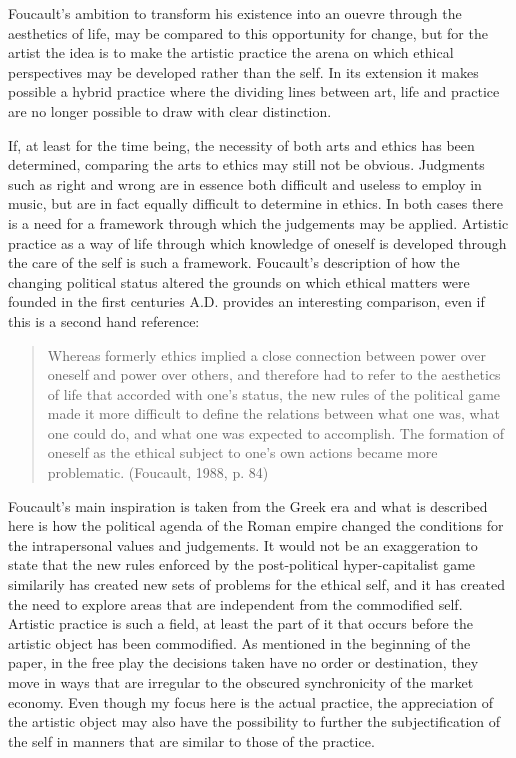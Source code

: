 \documentclass[11pt]{article}
\makeatletter
\newcommand{\cslcitation}[2]
 {\protect\hyper@linkstart{cite}{citeproc_bib_item_#1}#2\hyper@linkend}
\makeatother
\begin{document}
Foucault's ambition to transform his existence into an ouevre through the aesthetics of life, may be compared to this opportunity for change, but for the artist the idea is to make the artistic practice the arena on which ethical perspectives may be developed rather than the self. In its extension it makes possible a hybrid practice where the dividing lines between art, life and practice are no longer possible to draw with clear distinction.

If, at least for the time being, the necessity of both arts and ethics has been determined, comparing the arts to ethics may still not be obvious.
Judgments such as right and wrong are in essence both difficult and useless to employ in music, but are in fact equally difficult to determine in ethics. In both cases there is a need for a framework through which the judgements may be applied.  Artistic practice as a way of life through which knowledge of oneself is developed through the care of the self is such a framework. Foucault's description of how the changing political status altered the grounds on which ethical matters were founded in the first centuries A.D. provides an interesting comparison, even if this is a second hand reference:
\begin{quote}
Whereas formerly ethics implied a close connection between power over oneself and power over others, and therefore had to refer to the aesthetics of life that accorded with one's status, the new rules of the political game made it more difficult to define the relations between what one was, what one could do, and what one was expected to accomplish. The formation of oneself as the ethical subject to one's own actions became more problematic. (\cslcitation{7}{Foucault, 1988, p. 84})
\end{quote}
Foucault's main inspiration is taken from the Greek era and what is described here is how the political agenda of the Roman empire changed the conditions for the intrapersonal values and judgements.
It would not be an exaggeration to state that the new rules enforced by the post-political hyper-capitalist game similarily has created new sets of problems for the ethical self, and it has created the need to explore areas that are independent from the commodified self. Artistic practice is such a field, at least the part of it that occurs before the artistic object has been commodified. As mentioned in the beginning of the paper, in the free play the decisions taken have no order or destination, they move in ways that are irregular to the obscured synchronicity of the market economy. Even though my focus here is the actual practice, the appreciation of the artistic object may also have the possibility to further the subjectification of the self in manners that are similar to those of the practice. 
\end{document}
